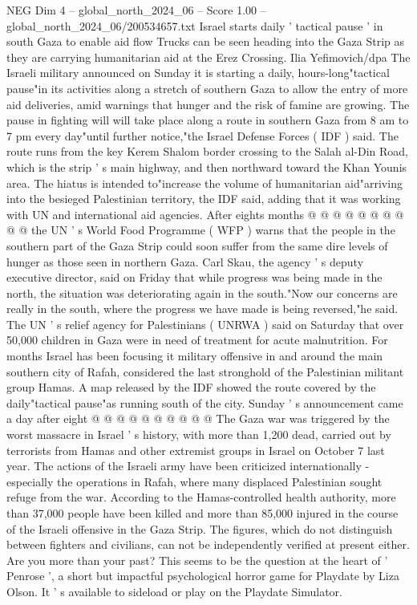 \begin{textsample}{NEG Dim 4 – global\_north\_2024\_06 – Score 1.00 – global\_north\_2024\_06/200534657.txt}  \label{ex:f4_neg_319}
Israel starts daily ' tactical pause ' in south Gaza to enable aid flow Trucks can be seen heading into the Gaza Strip as they are carrying humanitarian aid at the Erez Crossing.
Ilia Yefimovich/dpa The Israeli military announced on Sunday it is starting a daily, hours-long"tactical pause"in its activities along a stretch of southern Gaza to allow the entry of more aid deliveries, amid warnings that hunger and the risk of famine are growing.
The pause in fighting will will take place along a route in southern Gaza from 8 am to 7 pm every day"until further notice,"the Israel Defense Forces ( IDF ) said.
The route runs from the key Kerem Shalom border crossing to the Salah al-Din Road, which is the strip ' s main highway, and then northward toward the Khan Younis area.
The hiatus is intended to"increase the volume of humanitarian aid"arriving into the besieged Palestinian territory, the IDF said, adding that it was working with UN and international aid agencies.
After eights months @ @ @ @ @ @ @ @ @ @ the UN ' s World Food Programme ( WFP ) warns that the people in the southern part of the Gaza Strip could soon suffer from the same dire levels of hunger as those seen in northern Gaza.
Carl Skau, the agency ' s deputy executive director, said on Friday that while progress was being made in the north, the situation was deteriorating again in the south."Now our concerns are really in the south, where the progress we have made is being reversed,"he said.
The UN ' s relief agency for Palestinians ( UNRWA ) said on Saturday that over 50,000 children in Gaza were in need of treatment for acute malnutrition.
For months Israel has been focusing it military offensive in and around the main southern city of Rafah, considered the last stronghold of the Palestinian militant group Hamas.
A map released by the IDF showed the route covered by the daily"tactical pause"as running south of the city.
Sunday ' s announcement came a day after eight @ @ @ @ @ @ @ @ @ @ The Gaza war was triggered by the worst massacre in Israel ' s history, with more than 1,200 dead, carried out by terrorists from Hamas and other extremist groups in Israel on October 7 last year.
The actions of the Israeli army have been criticized internationally - especially the operations in Rafah, where many displaced Palestinian sought refuge from the war.
According to the Hamas-controlled health authority, more than 37,000 people have been killed and more than 85,000 injured in the course of the Israeli offensive in the Gaza Strip.
The figures, which do not distinguish between fighters and civilians, can not be independently verified at present either.
Are you more than your past?
This seems to be the question at the heart of ' Penrose ', a short but impactful psychological horror game for Playdate by Liza Olson.
It ' s available to sideload or play on the Playdate Simulator.

\end{textsample}
